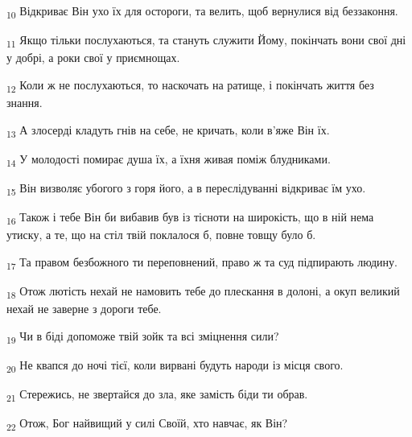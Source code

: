 \begin{tcolorbox}
\textsubscript{10} Відкриває Він ухо їх для остороги, та велить, щоб вернулися від беззаконня.
\end{tcolorbox}
\begin{tcolorbox}
\textsubscript{11} Якщо тільки послухаються, та стануть служити Йому, покінчать вони свої дні у добрі, а роки свої у приємнощах.
\end{tcolorbox}
\begin{tcolorbox}
\textsubscript{12} Коли ж не послухаються, то наскочать на ратище, і покінчать життя без знання.
\end{tcolorbox}
\begin{tcolorbox}
\textsubscript{13} А злосерді кладуть гнів на себе, не кричать, коли в'яже Він їх.
\end{tcolorbox}
\begin{tcolorbox}
\textsubscript{14} У молодості помирає душа їх, а їхня живая поміж блудниками.
\end{tcolorbox}
\begin{tcolorbox}
\textsubscript{15} Він визволяє убогого з горя його, а в переслідуванні відкриває їм ухо.
\end{tcolorbox}
\begin{tcolorbox}
\textsubscript{16} Також і тебе Він би вибавив був із тісноти на широкість, що в ній нема утиску, а те, що на стіл твій поклалося б, повне товщу було б.
\end{tcolorbox}
\begin{tcolorbox}
\textsubscript{17} Та правом безбожного ти переповнений, право ж та суд підпирають людину.
\end{tcolorbox}
\begin{tcolorbox}
\textsubscript{18} Отож лютість нехай не намовить тебе до плескання в долоні, а окуп великий нехай не заверне з дороги тебе.
\end{tcolorbox}
\begin{tcolorbox}
\textsubscript{19} Чи в біді допоможе твій зойк та всі зміцнення сили?
\end{tcolorbox}
\begin{tcolorbox}
\textsubscript{20} Не квапся до ночі тієї, коли вирвані будуть народи із місця свого.
\end{tcolorbox}
\begin{tcolorbox}
\textsubscript{21} Стережись, не звертайся до зла, яке замість біди ти обрав.
\end{tcolorbox}
\begin{tcolorbox}
\textsubscript{22} Отож, Бог найвищий у силі Своїй, хто навчає, як Він?
\end{tcolorbox}
